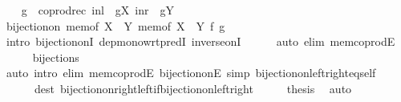 \begin{isabellebody}
\ \ \isamarkupfalse%
\ {\isacharquery}{\kern0pt}g\ {\isacharequal}{\kern0pt}\ {\isachardoublequoteopen}coprod{\isacharunderscore}{\kern0pt}rec\ {\isacharparenleft}{\kern0pt}inl\ {\isasymcirc}\ gX{\isacharparenright}{\kern0pt}\ {\isacharparenleft}{\kern0pt}inr\ {\isasymcirc}\ gY{\isacharparenright}{\kern0pt}{\isachardoublequoteclose}\isanewline
\ \ \isamarkupfalse%
\ {\isachardoublequoteopen}bijection{\isacharunderscore}{\kern0pt}on\ {\isacharparenleft}{\kern0pt}mem{\isacharunderscore}{\kern0pt}of\ {\isacharparenleft}{\kern0pt}X\ {\isasymCoprod}\ Y{\isacharparenright}{\kern0pt}{\isacharparenright}{\kern0pt}\ {\isacharparenleft}{\kern0pt}mem{\isacharunderscore}{\kern0pt}of\ {\isacharparenleft}{\kern0pt}X{\isacharprime}{\kern0pt}\ {\isasymCoprod}\ Y{\isacharprime}{\kern0pt}{\isacharparenright}{\kern0pt}{\isacharparenright}{\kern0pt}\ {\isacharquery}{\kern0pt}f\ {\isacharquery}{\kern0pt}g{\isachardoublequoteclose}\isanewline
\ \ \ \ \isamarkupfalse%
\ {\isacharparenleft}{\kern0pt}intro\ bijection{\isacharunderscore}{\kern0pt}onI\ dep{\isacharunderscore}{\kern0pt}mono{\isacharunderscore}{\kern0pt}wrt{\isacharunderscore}{\kern0pt}predI\ inverse{\isacharunderscore}{\kern0pt}onI{\isacharparenright}{\kern0pt}\isanewline
\ \ \ \ \isamarkupfalse%
\ {\isacharparenleft}{\kern0pt}auto\ elim{\isacharcolon}{\kern0pt}\ mem{\isacharunderscore}{\kern0pt}coprodE{\isacharparenright}{\kern0pt}\isanewline
\ \ \ \ \isamarkupfalse%
\ bijections\ \isamarkupfalse%
\ {\isacharparenleft}{\kern0pt}auto\ intro{\isacharcolon}{\kern0pt}\ elim{\isacharcolon}{\kern0pt}\ mem{\isacharunderscore}{\kern0pt}coprodE\ bijection{\isacharunderscore}{\kern0pt}onE\ simp{\isacharcolon}{\kern0pt}\ bijection{\isacharunderscore}{\kern0pt}on{\isacharunderscore}{\kern0pt}left{\isacharunderscore}{\kern0pt}right{\isacharunderscore}{\kern0pt}eq{\isacharunderscore}{\kern0pt}self\isanewline
\ \ \ \ \ \ dest{\isacharcolon}{\kern0pt}\ bijection{\isacharunderscore}{\kern0pt}on{\isacharunderscore}{\kern0pt}right{\isacharunderscore}{\kern0pt}left{\isacharunderscore}{\kern0pt}if{\isacharunderscore}{\kern0pt}bijection{\isacharunderscore}{\kern0pt}on{\isacharunderscore}{\kern0pt}left{\isacharunderscore}{\kern0pt}right{\isacharparenright}{\kern0pt}\isanewline
\ \ \isamarkupfalse%
\ \isamarkupfalse%
\ {\isacharquery}{\kern0pt}thesis\ \isamarkupfalse%
\ auto\isanewline
{}\isamarkupfalse%
%
\endisatagproof
{\isafoldproof}%
%
\isadelimproof
\isanewline
%
\endisadelimproof

\end{isabellebody}
